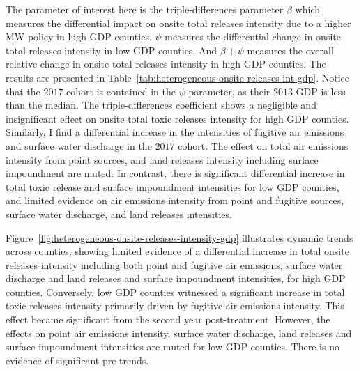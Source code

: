 \documentclass[12pt, english]{article}
\begin{document}
    The parameter of interest here is the triple-differences parameter $\beta$ which measures the differential impact on onsite total releases intensity due to a higher MW policy in high GDP counties. $\psi$ measures the differential change in onsite total releases intensity in low GDP counties. And $\beta + \psi$ measures the overall relative change in onsite total releases intensity in high GDP counties. The results are presented in Table~\ref{tab:heterogeneous-onsite-releases-int-gdp}. Notice that the $2017$ cohort is contained in the $\psi$ parameter, as their $2013$ GDP is less than the median. The triple-differences coefficient shows a negligible and insignificant effect on onsite total toxic releases intensity for high GDP counties. Similarly, I find a differential increase in the intensities of fugitive air emissions and surface water discharge in the $2017$ cohort. The effect on total air emissions intensity from point sources, and land releases intensity including surface impoundment are muted. In contrast, there is significant differential increase in total toxic release and surface impoundment intensities for low GDP counties, and limited evidence on air emissions intensity from point and fugitive sources, surface water discharge, and land releases intensities.
    
    

    Figure~\ref{fig:heterogeneous-onsite-releases-intensity-gdp} illustrates dynamic trends across counties, showing limited evidence of a differential increase in total onsite releases intensity including both point and fugitive air emissions, surface water discharge and land releases and surface impoundment intensities, for high GDP counties. Conversely, low GDP counties witnessed a significant increase in total toxic releases intensity primarily driven by fugitive air emissions intensity. This effect became significant from the second year post-treatment. However, the effects on point air emissions intensity, surface water discharge, land releases and surface impoundment intensities are muted for low GDP counties. There is no evidence of significant pre-trends.
\end{document}

